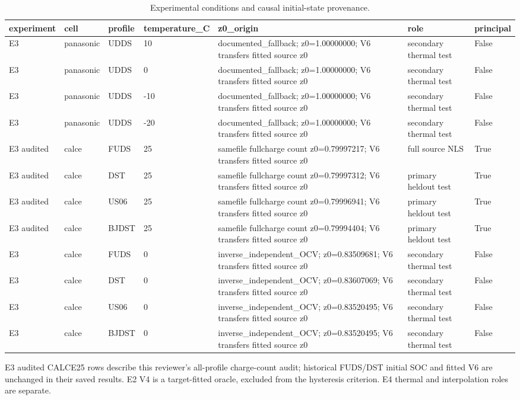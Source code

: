 \begin{table}[!t]
\centering
\footnotesize
\caption{Experimental conditions and causal initial-state provenance.}
\label{tab:reviewer-conditions-4}
\setlength{\tabcolsep}{3pt}
\begin{tabular}{llll p{} p{} l}
\toprule
experiment & cell & profile & temperature\_C & z0\_origin & role & principal \\
\midrule
E3 & panasonic & UDDS & 10 & documented\_fallback; z0=1.00000000; V6 transfers fitted source z0 & secondary thermal test & False \\
E3 & panasonic & UDDS & 0 & documented\_fallback; z0=1.00000000; V6 transfers fitted source z0 & secondary thermal test & False \\
E3 & panasonic & UDDS & -10 & documented\_fallback; z0=1.00000000; V6 transfers fitted source z0 & secondary thermal test & False \\
E3 & panasonic & UDDS & -20 & documented\_fallback; z0=1.00000000; V6 transfers fitted source z0 & secondary thermal test & False \\
E3 audited & calce & FUDS & 25 & samefile fullcharge count z0=0.79997217; V6 transfers fitted source z0 & full source NLS & True \\
E3 audited & calce & DST & 25 & samefile fullcharge count z0=0.79997312; V6 transfers fitted source z0 & primary heldout test & True \\
E3 audited & calce & US06 & 25 & samefile fullcharge count z0=0.79996941; V6 transfers fitted source z0 & primary heldout test & True \\
E3 audited & calce & BJDST & 25 & samefile fullcharge count z0=0.79994404; V6 transfers fitted source z0 & primary heldout test & True \\
E3 & calce & FUDS & 0 & inverse\_independent\_OCV; z0=0.83509681; V6 transfers fitted source z0 & secondary thermal test & False \\
E3 & calce & DST & 0 & inverse\_independent\_OCV; z0=0.83607069; V6 transfers fitted source z0 & secondary thermal test & False \\
E3 & calce & US06 & 0 & inverse\_independent\_OCV; z0=0.83520495; V6 transfers fitted source z0 & secondary thermal test & False \\
E3 & calce & BJDST & 0 & inverse\_independent\_OCV; z0=0.83520495; V6 transfers fitted source z0 & secondary thermal test & False \\
\bottomrule
\end{tabular}
\par\smallskip\begin{minipage}{0.98\textwidth}\footnotesize E3 audited CALCE25 rows describe this reviewer's all-profile charge-count audit; historical FUDS/DST initial SOC and fitted V6 are unchanged in their saved results. E2 V4 is a target-fitted oracle, excluded from the hysteresis criterion. E4 thermal and interpolation roles are separate.\end{minipage}
\end{table}

